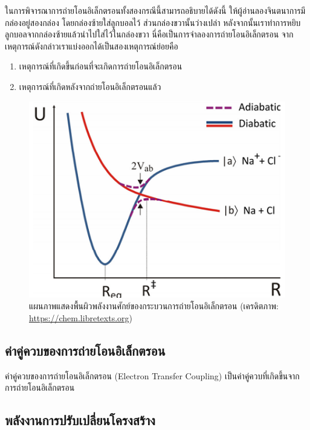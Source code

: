 ในการพิจารณาการถ่ายโอนอิเล็กตรอนทั้งสองกรณีนี้สามารถอธิบายได้ดังนี้ ให้ผู้อ่านลองจินตนาการมีกล่องอยู่สองกล่อง โดยกล่องซ้ายใส่ลูกบอลไว้ 
ส่วนกล่องขวานั้นว่างเปล่า หลังจากนั้นเราทำการหยิบลูกบอลจากกล่องซ้ายแล้วนำไปใส่ไว้ในกล่องขวา นี่คือเป็นการจำลองการถ่ายโอนอิเล็กตรอน 
จากเหตุการณ์ดังกล่าวเราแบ่งออกได้เป็นสองเหตุการณ์ย่อยคือ

\begin{enumerate}
    \item เหตุการณ์ที่เกิดขึ้นก่อนที่จะเกิดการถ่ายโอนอิเล็กตรอน
    
    \item เหตุการณ์ที่เกิดหลังจากถ่ายโอนอิเล็กตรอนแล้ว
\end{enumerate}

\begin{figure}[H]
    \centering
    \includegraphics[width=0.7\linewidth]{fig/et_diagram.png}
    \caption{แผนภาพแสดงพื้นผิวพลังงานศักย์ของกระบวนการถ่ายโอนอิเล็กตรอน (เครดิตภาพ: \url{https://chem.libretexts.org})}
    \label{fig:et_diagram}
\end{figure}

\subsection{ค่าคู่ควบของการถ่ายโอนอิเล็กตรอน}
\label{ssec:et_coupling}

ค่าคู่ควบของการถ่ายโอนอิเล็กตรอน (Electron Transfer Coupling) เป็นค่าคู่ควบที่เกิดขึ้นจากการถ่ายโอนอิเล็กตรอน

\subsection{พลังงานการปรับเปลี่ยนโครงสร้าง}
\label{ssec:reor_ener}

